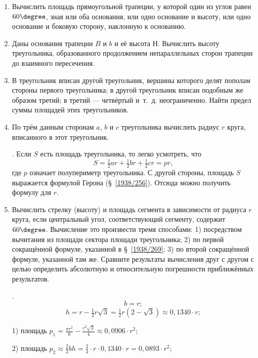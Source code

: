 \begin{center}
\end{center}

\begin{enumerate}[resume]


\item
Вычислить площадь прямоугольной трапеции, у которой один из углов равен $60\degree$, зная или оба основания, или одно основание и высоту, или одно основание и боковую сторону, наклонную к основанию.

\item
Даны основания трапеции $B$ и $b$ и её высота Н.
Вычислить высоту треугольника, образованного продолжением непараллельных сторон трапеции до взаимного пересечения.

\item
В треугольник вписан другой треугольник, вершины которого делят пополам стороны первого треугольника;
в другой треугольник вписан подобным же образом третий;
в третий — четвёртый и~т.~д.
неограниченно.
Найти предел суммы площадей этих треугольников.

\item
По трём данным сторонам $a$, $b$ и $c$ треугольника вычислить радиус $r$ круга, вписанного в этот треугольник.

\smallskip
{}.
Если $S$ есть площадь треугольника, то легко усмотреть, что
\[S=\tfrac12 ar+\tfrac12 br+\tfrac12 cr=pr,\]
где $p$ означает полупериметр треугольника.
С другой стороны, площадь $S$ выражается формулой Герона (§~\ref{1938/256}).
Отсюда можно получить формулу для $r$.


\item
Вычислить стрелку (высоту) и площадь сегмента в зависимости от радиуса $r$ круга, если центральный угол, соответствующий сегменту, содержит $60\degree$.
Вычисление это произвести тремя способами:
1) посредством вычитания из площади сектора площади треугольника;
2) по первой сокращённой формуле, указанной в §~\ref{1938/269};
3) по второй сокращённой формуле, указанной там же.
Сравните результаты вычисления друг с другом с целью определить абсолютную и относительную погрешности приближённых результатов.

\smallskip
{}.
\[b=r;\]
\[h=r-\tfrac12 r\sqrt3=\tfrac12 r(2-\sqrt3)\approx 0{,}1340\cdot r;\]

1) площадь $p_1=\frac{\pi r^2}{6}-\frac{r^2\sqrt3}{4}\approx 0{,}0906\cdot r^2$;

2) площадь $p_2\approx \tfrac23 bh=\tfrac23\cdot r\cdot 0{,}1340\cdot r=0{,}0893\cdot r^2$;


\end{enumerate}

